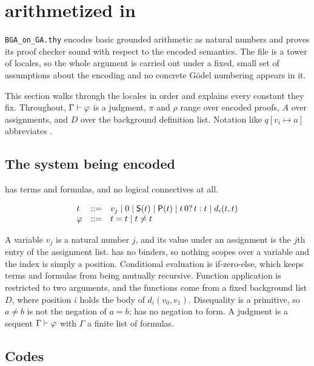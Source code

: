 \section{\BGA{} arithmetized in \QGA}
\label{sec:bga}

\texttt{BGA\_on\_GA.thy} encodes basic grounded arithmetic as \QGA{} natural
numbers and proves its proof checker sound with respect to the encoded
semantics.  The file is a tower of locales, so the whole argument is carried
out under a fixed, small set of assumptions about the encoding and no concrete
G\"odel numbering appears in it.

This section walks through the locales in order and explains every constant
they fix.  Throughout, $\Gamma \vdash \varphi$ is a \BGA{} judgment, $\pi$ and
$\rho$ range over encoded proofs, $A$ over assignments, and $D$ over the
background definition list.  Notation like $q[v_i \mapsto a]$ abbreviates
.

\subsection{The system being encoded}

\BGA{} has terms and formulas, and no logical connectives at all.

\[
\begin{array}{lcl}
t &::=& v_j \mid 0 \mid \mathsf{S}(t) \mid \mathsf{P}(t) \mid t\,0?\,t : t \mid d_i(t, t)\\
\varphi &::=& t = t \mid t \neq t
\end{array}
\]

\noindent
A variable $v_j$ is a natural number $j$, and its value under an assignment is
the $j$th entry of the assignment list.  \BGA{} has no binders, so nothing
scopes over a variable and the index is simply a position.  Conditional
evaluation is if-zero-else, which keeps terms and formulas from being mutually
recursive.  Function application is restricted to two arguments, and the
functions come from a fixed background list $D$, where position $i$ holds the
body of $d_i(v_0, v_1)$.  Disequality is a primitive, so $a \neq b$ is not the
negation of $a = b$; \BGA{} has no negation to form.  A judgment is a sequent
$\Gamma \vdash \varphi$ with $\Gamma$ a finite list of formulas.

\subsection{Codes}

